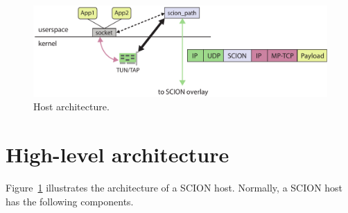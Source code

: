 \begin{figure}[ht]
\centering
\begin{minipage}{0.85\textwidth}
\includegraphics[width=1\columnwidth]{./fig/host2}
\end{minipage}
\caption{Host architecture.}\label{fig:host}
\end{figure}

\section{High-level architecture} 


Figure~\ref{fig:host} illustrates the architecture of a SCION host.
Normally, a SCION host has the following components.

